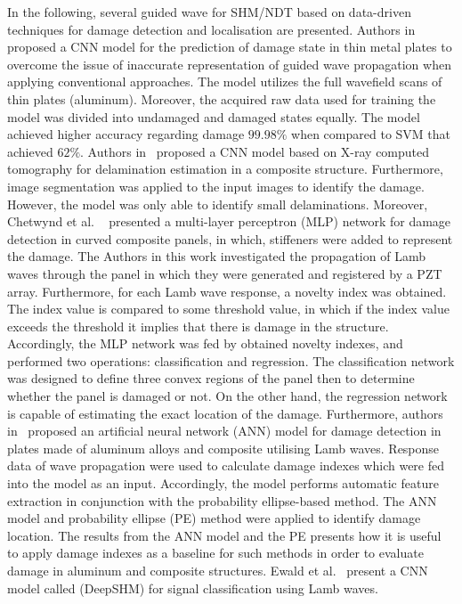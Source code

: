 In the following, several guided wave for SHM/NDT based on data-driven techniques for damage detection and localisation are presented.
Authors in~\cite{Melville1949} proposed a CNN model for the prediction of damage state in thin metal plates to overcome the issue of inaccurate representation of guided wave propagation when applying conventional approaches. 
The model utilizes the full wavefield scans of thin plates (aluminum).
Moreover, the acquired raw data used for training the model was divided into undamaged and damaged states equally.
The model achieved higher accuracy regarding damage  \(99.98\%\) when compared to SVM that achieved \(62\%\).
Authors in~\cite{Sammons2016} proposed a CNN model based on X-ray computed tomography for delamination estimation in a composite structure.
Furthermore, image segmentation was applied to the input images to identify the damage.
However, the model was only able to identify small delaminations.
Moreover, Chetwynd et al. ~\cite{Chetwynd2008} presented a multi-layer perceptron (MLP) network for damage detection in curved composite panels, in which, stiffeners were added to represent the damage.
The Authors in this work investigated the propagation of Lamb waves through the panel in which they were generated and registered by a PZT array.
Furthermore, for each Lamb wave response, a novelty index was obtained.
The index value is compared to some threshold value, in which if the index value exceeds the threshold it implies that there is damage in the structure.
Accordingly, the MLP network was fed by obtained novelty indexes, and performed two operations: classification and regression.
The classification network was designed to define three convex regions of the panel then to determine whether the panel is damaged or not.
On the other hand, the regression network is capable of estimating the exact location of the damage.
Furthermore, authors in~\cite{DeFenza2015} proposed an artificial neural network (ANN) model for damage detection in plates made of aluminum alloys and composite utilising Lamb waves.
Response data of wave propagation were used to calculate damage indexes which were fed into the model as an input.
Accordingly, the model performs automatic feature extraction in conjunction with the probability ellipse-based method. 
The ANN model and probability ellipse (PE) method were applied to identify damage location.
The results from the ANN model and the PE presents how it is useful to apply damage indexes as a baseline for such methods in order to evaluate damage in aluminum and composite structures. 
Ewald et al.~\cite{Ewald2019} present a CNN model called (DeepSHM) for signal classification using Lamb waves.
